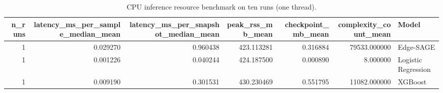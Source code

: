 \begin{table}[tb]
\caption{CPU inference resource benchmark on ten runs (one thread).}
\label{tab:inference-resources}
\begin{tabular}{rrrrrrl}
\toprule
n\_runs & latency\_ms\_per\_sample\_median\_mean & latency\_ms\_per\_snapshot\_median\_mean & peak\_rss\_mb\_mean & checkpoint\_mb\_mean & complexity\_count\_mean & Model \\
\midrule
1 & 0.029270 & 0.960438 & 423.113281 & 0.316884 & 79533.000000 & Edge-SAGE \\
1 & 0.001226 & 0.040244 & 424.187500 & 0.000890 & 8.000000 & Logistic Regression \\
1 & 0.009190 & 0.301531 & 430.230469 & 0.551795 & 11082.000000 & XGBoost \\
\bottomrule
\end{tabular}
\end{table}
